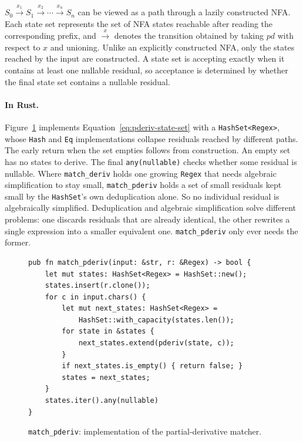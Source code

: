 $S_0\xrightarrow{x_1}S_1\xrightarrow{x_2}\cdots\xrightarrow{x_n}S_n$
can be viewed as a path through a lazily constructed NFA. 
Each state set represents the set of NFA states reachable 
after reading the corresponding prefix, 
and $\xrightarrow{x}$ denotes the transition obtained by taking $pd$ 
with respect to $x$ and unioning. 
Unlike an explicitly constructed NFA, 
only the states reached by the input are constructed. 
A state set is accepting exactly when it contains at least one nullable residual, 
so acceptance is determined by whether the final state set contains a nullable residual.

%

\paragraph{In Rust.}
Figure~\ref{fig:pderiv-loop-rust} implements Equation~\eqref{eq:pderiv-state-set}
with a \texttt{HashSet<Regex>},
whose \texttt{Hash} and \texttt{Eq} implementations collapse residuals
reached by different paths. 
The early return when the set empties follows from construction.
An empty set has no states to derive. 
The final \texttt{any(nullable)} checks whether some residual is nullable.
Where \texttt{match\_deriv} holds one growing \texttt{Regex}
that needs algebraic simplification to stay small,
\texttt{match\_pderiv} holds a set of small residuals
kept small by the \texttt{HashSet}'s own deduplication alone.
So no individual residual is algebraically simplified.
Deduplication and algebraic simplification solve different problems:
one discards residuals that are already identical,
the other rewrites a single expression into a smaller equivalent one.
\texttt{match\_pderiv} only ever needs the former.

\begin{figure}[ht]
\small
\begin{verbatim}
pub fn match_pderiv(input: &str, r: &Regex) -> bool {
    let mut states: HashSet<Regex> = HashSet::new();
    states.insert(r.clone());
    for c in input.chars() {
        let mut next_states: HashSet<Regex> =
            HashSet::with_capacity(states.len());
        for state in &states {
            next_states.extend(pderiv(state, c));
        }
        if next_states.is_empty() { return false; }
        states = next_states;
    }
    states.iter().any(nullable)
}
\end{verbatim}
\caption{\texttt{match\_pderiv}: implementation of the
partial-derivative matcher.}
\label{fig:pderiv-loop-rust}
\end{figure}

